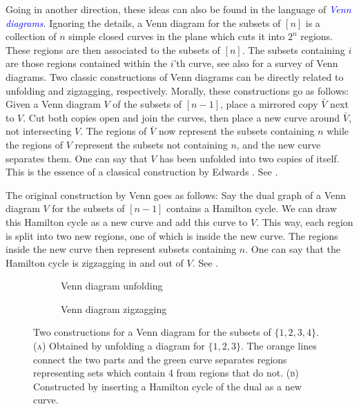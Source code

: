 \documentclass[fontsize=11pt,a4paper,DIV=12]{scrartcl}
\newcommand{\defn}[1]{\textsl{\textcolor{Blue}{#1}}}
\begin{document}
Going in another direction, these ideas can also be found in the language of \defn{Venn diagrams}. Ignoring the details, a Venn diagram for the subsets of $[n]$ is a collection of $n$ simple closed curves in the plane which cuts it into $2^n$ regions. These regions are then associated to the subsets of $[n]$. The subsets containing $i$ are those regions contained within the $i$'th curve, see also \cite{Survey_Venn} for a survey of Venn diagrams. Two classic constructions of Venn diagrams can be directly related to unfolding and zigzagging, respectively. Morally, these constructions go as follows: Given a Venn diagram $V$ of the subsets of $[n-1]$, place a mirrored copy $\bar{V}$ next to $V$. Cut both copies open and join the curves, then place a new curve around $\bar V$, not intersecting $V$. The regions of $\bar V$ now represent the subsets containing $n$ while the regions of $V$ represent the subsets not containing $n$, and the new curve separates them. One can say that $V$ has been unfolded into two copies of itself. This is the essence of a classical construction by Edwards \cite{Edwards1989}. See .

The original construction by Venn goes as follows: Say the dual graph of a Venn diagram $V$ for the subsets of $[n-1]$ contains a Hamilton cycle. We can draw this Hamilton cycle as a new curve and add this curve to $V$. This way, each region is split into two new regions, one of which is inside the new curve. The regions inside the new curve then represent subsets containing $n$. One can say that the Hamilton cycle is zigzagging in and out of $V$. See .

\begin{figure}[htbp]
    \centering
    \begin{subfigure}[b]{0.48\textwidth}
        \centering
        
        \caption{Venn diagram unfolding}
        \label{fig:venn unfolding}
    \end{subfigure}
    \hfill
    \begin{subfigure}[b]{0.48\textwidth}
        \centering
        
        \caption{Venn diagram zigzagging}
        \label{fig:venn zigzagging}
    \end{subfigure}
    
    \caption{Two constructions for a Venn diagram for the subsets of $\{1,2,3,4\}$. (\textsc{a}) Obtained by unfolding a diagram for $\{1,2,3\}$. The orange lines connect the two parts and the green curve separates regions representing sets which contain 4 from regions that do not. (\textsc{b}) Constructed by inserting a Hamilton cycle of the dual as a new curve.}
    \label{fig:combined_venn}
\end{figure}
\end{document}
